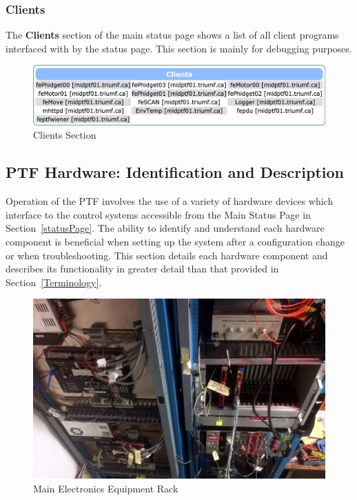 \documentclass[twoside,letterpaper]{refart}
\newcommand{\picwidth}{0.7 \textwidth}
\begin{document}
\FloatBarrier

\subsubsection{Clients}

The \textbf{Clients} section of the main status page shows a list of all client programs interfaced with by the status page. This section is mainly for debugging purposes.

\FloatBarrier

\begin{figure}[!htpb]\centering	
	\includegraphics[width=\textwidth]{images/clients.png}
	\caption{Clients Section\label{clients}}
\end{figure}

\FloatBarrier

\clearpage

\subsection{PTF Hardware: Identification and Description}

Operation of the PTF involves the use of a variety of hardware devices which interface to the control systems accessible from the Main Status Page in Section~\ref{statusPage}. The ability to identify and understand each hardware component is beneficial when setting up the system after a configuration change or when troubleshooting. This section details each hardware component and describes its functionality in greater detail than that provided in Section~\ref{Terminology}.

\FloatBarrier

\begin{figure}[!htpb]\centering	
	\includegraphics[width=\picwidth]{images/rack}
	\caption{Main Electronics Equipment Rack\label{mainEquipmentRack}}
\end{figure}
\end{document}
